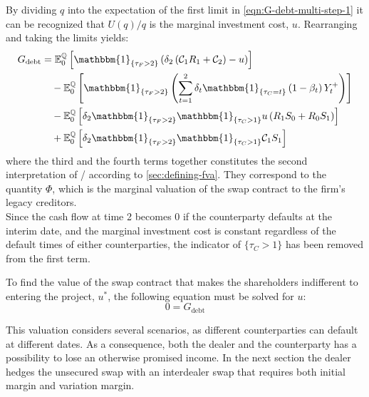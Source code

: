 \documentclass[main.tex]{subfiles}
\begin{document}
        By dividing $q$ into the expectation of the first limit in \cref{eqn:G-debt-multi-step-1}
        it can be recognized that $U(q)/q$ is the marginal investment cost, $u$.
        Rearranging and taking the limits yields:
        \begin{align}
            G_{\text{debt}} &= 
            \mathbb{E}_{0}^{\rnmeasure}\left[
                \mathbbm{1}_{\{\tau_{F}>2\}}
                \left(
                    \delta_{2} \left(\mathcal{C}_{1} R_{1} + \mathcal{C}_{2}\right) - u
                \right)
            \right]
            \nonumber
            \\
            &\quad-
            \mathbb{E}_{0}^{\rnmeasure}\left[
                \mathbbm{1}_{\{\tau_{F}>2\}}
                \left(
                    \sum_{t=1}^{2} \delta_{t} \mathbbm{1}_{\{\tau_{C}=t\}}\left(1-\beta_t\right)Y_{t}^{+}
                \right)
            \right]
            \nonumber
            \\
            &\quad-
            \mathbb{E}_{0}^{\rnmeasure}\left[
                \delta_2 \mathbbm{1}_{\{\tau_{F}>2\}} \mathbbm{1}_{\{\tau_{C}>1\}} u \left(
                    R_{1} S_{0} + R_{0} S_{1}
                \right)
            \right]
            \nonumber
            \\
            &\quad+
            \mathbb{E}_{0}^{\rnmeasure}\left[
                \delta_2 \mathbbm{1}_{\{\tau_{F}>2\}} \mathbbm{1}_{\{\tau_{C}>1\}}
                \mathcal{C}_{1} S_1
            \right]
        \end{align}
        where the third and the fourth terms together constitutes the second interpretation of \FVA/ according to \cref{sec:defining-fva}.
        They correspond to the quantity $\Phi$, which is the marginal valuation of the swap contract to the firm's legacy creditors.
        \\
        Since the cash flow at time 2 becomes 0 if the counterparty defaults at the interim date,
        and the marginal investment cost is constant regardless of the default times of either counterparties,
        the indicator of $\{\tau_{C}>1\}$ has been removed from the first term.

        To find the value of the swap contract that makes the shareholders indifferent to entering the project, $u^{\ast}$,
        the following equation must be solved for $u$:
        \begin{equation}
            0 = G_{\text{debt}}
        \end{equation}

        This valuation considers several scenarios, as different counterparties can default at different dates.
        As a consequence, both the dealer and the counterparty has a possibility to lose an otherwise promised income.
        In the next section the dealer hedges the unsecured swap with an interdealer swap that requires both initial margin and variation margin.
\end{document}
